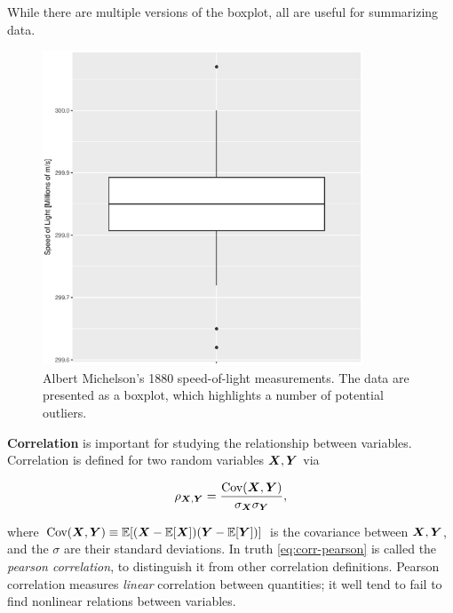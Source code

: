 \documentclass[../primer.tex]{subfiles}
\begin{document}
While there are multiple versions of the boxplot,\cite{frigge1989some} all are
useful for summarizing data.

\begin{figure}[!ht]
  \centering
  \includegraphics[width=0.85\textwidth]{./images/michelson_boxplot}

  \caption{Albert Michelson's 1880 speed-of-light measurements. The data are
    presented as a boxplot, which highlights a number of potential outliers.}
\end{figure}

\textbf{Correlation} is important for studying the relationship between
variables. Correlation is defined for two random variables $\boldsymbol{X},\boldsymbol{Y}$ via

\begin{equation} \label{eq:corr-pearson}
  \rho_{\boldsymbol{X},\boldsymbol{Y}} = \frac{\text{Cov}(\boldsymbol{X},\boldsymbol{Y})}{\sigma_{\boldsymbol{X}}\sigma_{\boldsymbol{Y}}},
\end{equation}

\noindent where $\text{Cov}(\boldsymbol{X},\boldsymbol{Y})\equiv\mathbb{E}[(\boldsymbol{X}-\mathbb{E}[\boldsymbol{X}])(\boldsymbol{Y}-\mathbb{E}[\boldsymbol{Y}])]$ is the
covariance between $\boldsymbol{X},\boldsymbol{Y}$, and the $\sigma$ are their standard deviations. In
truth \eqref{eq:corr-pearson} is called the \emph{pearson correlation}, to
distinguish it from other correlation definitions. Pearson correlation measures
\emph{linear} correlation between quantities; it well tend to fail to find
nonlinear relations between variables.
\end{document}
